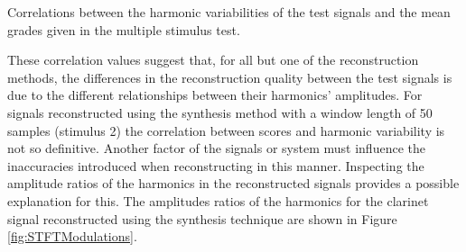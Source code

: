 		\begin{table}[h!]
			\centering
			
			\caption{Correlations between the harmonic variabilities of the test signals and 
				 the mean grades given in the multiple stimulus test.}
			\label{tab:HarmonicVariabilityCorrelations}
		\end{table}

		These correlation values suggest that, for all but one of the reconstruction methods, the differences in
		the reconstruction quality between the test signals is due to the different relationships between their
		harmonics' amplitudes. For signals reconstructed using the synthesis method with a window length of 50
		samples (stimulus 2) the correlation between scores and harmonic variability is not so definitive. Another
		factor of the signals or system must influence the inaccuracies introduced when reconstructing in this
		manner. Inspecting the amplitude ratios of the harmonics in the reconstructed signals provides a possible
		explanation for this. The amplitudes ratios of the harmonics for the clarinet signal reconstructed using
		the synthesis technique are shown in Figure \ref{fig:STFTModulations}.

